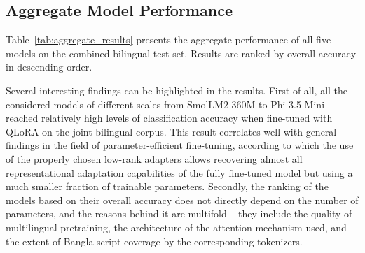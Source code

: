 \documentclass[journal]{IEEEtran}
\begin{document}
\subsection{Aggregate Model Performance}

Table~\ref{tab:aggregate_results} presents the aggregate performance of all five models on the
combined bilingual test set. Results are ranked by overall accuracy in
descending order.

\begin{table}[htbp]
\caption{Aggregate Performance of Fine-Tuned Models on the Combined Bilingual Test Set}
\label{tab:aggregate_results}
\begin{center}
\end{center}
\end{table}



Several interesting findings can be highlighted in the results. First of
all, all the considered models of different scales from SmolLM2-360M to
Phi-3.5 Mini reached relatively high levels of classification accuracy
when fine-tuned with QLoRA on the joint bilingual corpus. This result
correlates well with general findings in the field of
parameter-efficient fine-tuning, according to which the use of the
properly chosen low-rank adapters allows recovering almost all
representational adaptation capabilities of the fully fine-tuned model
but using a much smaller fraction of trainable parameters. Secondly, the
ranking of the models based on their overall accuracy does not directly
depend on the number of parameters, and the reasons behind it are
multifold -- they include the quality of multilingual pretraining, the
architecture of the attention mechanism used, and the extent of Bangla
script coverage by the corresponding tokenizers.
\end{document}
